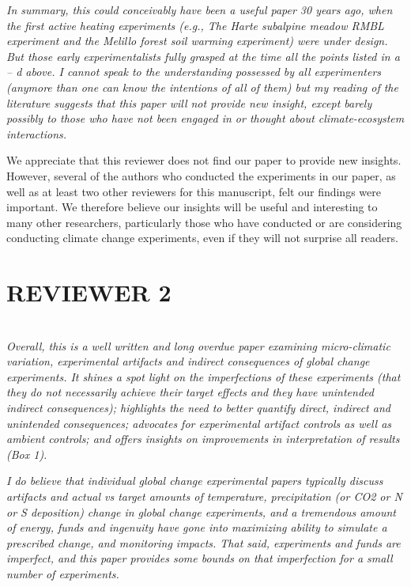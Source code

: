 \documentclass[11pt,a4paper]{letter}
\begin{document}
\begin{letter}{}
\emph{In summary, this could conceivably have been a useful paper 30 years ago, when the first active heating experiments (e.g., The Harte subalpine meadow RMBL experiment and the Melillo forest soil warming experiment) were under design.  But those early experimentalists fully grasped at the time all the points listed in a -- d above.  I cannot speak to the understanding possessed by all experimenters (anymore than one can know the intentions of all of them) but my reading of the literature suggests that this paper will not provide new insight, except barely possibly to those who have not been engaged in or thought about climate-ecosystem interactions.} 
\par We appreciate that this reviewer does not find our paper to provide new insights. However, several of the authors who conducted the experiments in our paper, as well as at least two other reviewers for this manuscript, felt our findings were important. We therefore believe our insights will be useful and interesting to many other researchers, particularly  those who have conducted or are considering conducting climate change experiments, even if they will not surprise all readers.

\section {REVIEWER 2}\\
\emph{Overall, this is a well written and long overdue paper examining micro-climatic variation, experimental artifacts and indirect consequences of global change experiments.  It shines a spot light on the imperfections of these experiments (that they do not necessarily achieve their target effects and they have unintended indirect consequences); highlights the need to better quantify direct, indirect and unintended consequences; advocates for experimental artifact controls as well as ambient controls;  and offers insights on improvements in interpretation of results (Box 1).}

\par \emph{I do believe that individual global change experimental papers typically discuss artifacts and actual vs target amounts of temperature, precipitation (or CO2 or N or S deposition) change in global change experiments, and a  tremendous amount of energy, funds and ingenuity have gone into maximizing ability to simulate a prescribed change, and monitoring impacts.  That said, experiments and funds are imperfect, and this paper provides some bounds on that imperfection for a small number of experiments.}


\end{letter}
\end{document}
